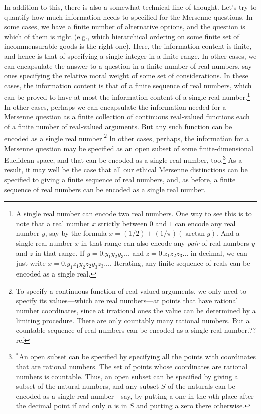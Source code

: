 In addition to this, there is also a somewhat technical line of thought. Let's try to quantify how much information
needs to specified for the Mersenne questions. In some cases, we have a finite number of alternative options, and 
the question is which of them is right (e.g., which hierarchical ordering on some finite set of incommensurable goods 
is the right one). Here, the information content is finite, and hence is that of specifying a single integer in a 
finite range. In other cases, we can encapsulate the answer to a question
in a finite number of real numbers, say ones specifying the relative moral weight of some set of considerations.
In these cases, the information content is that of a finite sequence of real numbers, which can be proved to have 
at most the information content of a single real number.\footnote{\label{fn:encode}A single real number can encode two real numbers.
One way to see this is to note that a real number $x$ strictly between $0$ and $1$ can encode any real number
$y$, say by the formula $x = (1/2)+(1/\pi)(\arctan y)$. And a single real number $x$ in that range can also encode 
any \textit{pair} of real numbers $y$ and $z$ in that range. If $y=0.y_1y_2y_3...$ and $z=0.z_1z_2z_3...$ in decimal,
we can just write $x=0.y_1z_1y_2z_2y_3z_3...$. Iterating, any finite sequence of reals can be encoded as a single real.} In other cases, perhaps we can encapsulate the information needed
for a Mersenne question as a finite collection of continuous real-valued functions each of a finite number of 
real-valued arguments. But any such function can be encoded as a single real number.\footnote{To specify a 
continuous function of real valued arguments, we only need to specify its values---which are real numbers---at points that have rational number coordinates, since at irrational ones the value can be determined by a limiting procedure. There are
only countably many rational numbers. But a countable sequence of real numbers can be encoded as a single real
number.??ref} In other cases, perhaps, the information for a Mersenne question may be specified as an open subset of
some finite-dimensional Euclidean space, and that can be encoded as a single real number, too.\footnote{$^*$An open subset
can be specified by specifying all the points with coordinates that are rational numbers. The set of points whose
coordinates are rational numbers is countable. Thus, an open subset can be specified by giving a subset of the natural
numbers, and any subset $S$ of the naturals can be encoded as a single real number---say, by putting a one in the
$n$th place after the decimal point if and only $n$ is in $S$ and putting a zero there otherwise.} As a result, it
may well be the case that all our ethical Mersenne distinctions can be specified to giving a finite sequence of 
real numbers, and, as before, a finite sequence of real numbers can be encoded as a single real number. 

